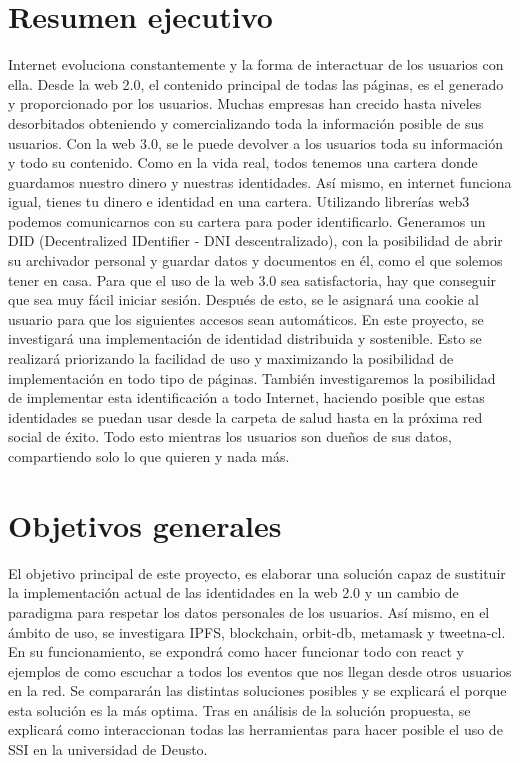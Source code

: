 \section*{Resumen ejecutivo}
Internet evoluciona constantemente y la forma de interactuar de los usuarios con ella. Desde la web 2.0, el contenido principal de todas las páginas, es el generado y proporcionado por los usuarios. Muchas empresas han crecido hasta niveles desorbitados obteniendo y comercializando toda la información posible de sus usuarios. Con la web 3.0, se le puede devolver a los usuarios toda su información y todo su contenido. Como en la vida real, todos tenemos una cartera donde guardamos nuestro dinero y nuestras identidades. Así mismo, en internet funciona igual, tienes tu dinero e identidad en una cartera. Utilizando librerías web3 podemos comunicarnos con su cartera para poder identificarlo. Generamos un DID (Decentralized IDentifier - DNI descentralizado), con la posibilidad de abrir su archivador personal y guardar datos y documentos en él, como el que solemos tener en casa. Para que el uso de la web 3.0 sea satisfactoria, hay que conseguir que sea muy fácil iniciar sesión. Después de esto, se le asignará una cookie al usuario para que los siguientes accesos sean automáticos. En este proyecto, se investigará una implementación de identidad distribuida y sostenible. Esto se realizará priorizando la facilidad de uso y maximizando la posibilidad de implementación en todo tipo de páginas. También investigaremos la posibilidad de implementar esta identificación a todo Internet, haciendo posible que estas identidades se puedan usar desde la carpeta de salud hasta en la próxima red social de éxito. Todo esto mientras los usuarios son dueños de sus datos, compartiendo solo lo que quieren y nada más.
\section*{Objetivos generales}
El objetivo principal de este proyecto, es elaborar una solución capaz de sustituir la implementación actual de las identidades en la web 2.0 y un cambio de paradigma para respetar los datos personales de los usuarios. Así mismo, en el ámbito de uso, se investigara IPFS, blockchain, orbit-db, metamask y tweetna-cl. En su funcionamiento, se expondrá como hacer funcionar todo con react y ejemplos de como escuchar a todos los eventos que nos llegan desde otros usuarios en la red. Se compararán las distintas soluciones posibles y se explicará el porque esta solución es la más optima.
Tras en análisis de la solución propuesta, se explicará como interaccionan todas las herramientas para hacer posible el uso de SSI en la universidad de Deusto.
